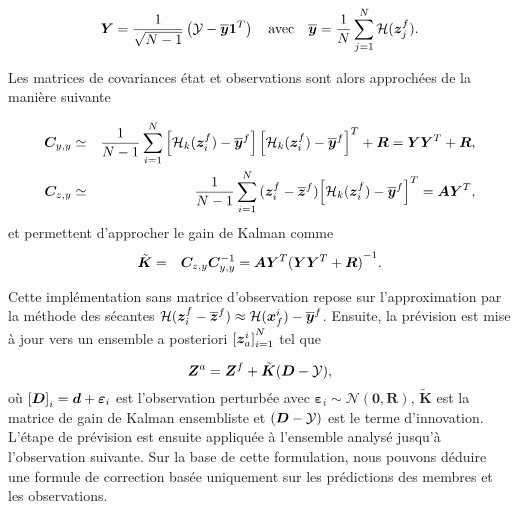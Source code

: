 \begin{equation*}
    \bm Y = \frac{1}{\sqrt{N - 1}} \left(\mathcal Y - \overline{\bm{y}} \bm{1}^T \right) \quad \text{avec} \quad \overline{\bm{y}} = \frac{1}{N} \sum_{j=1}^{N} \mathcal{H}(\bm{z}_j^f).
\end{equation*}

Les matrices de covariances état et observations sont alors approchées de la manière suivante

\begin{eqnarray*}
    \bm C_{y, y} &\simeq& \frac{1}{N -1} \sum_{i = 1}^{N}\left[ \mathcal{H}_k(\bm{z}_i^f) - \overline{\bm{y}}^f\right] {\left[ \mathcal{H}_k(\bm{z}_i^f) - \overline{\bm{y}}^f\right]}^T + \bm R= \bm Y \bm Y^T + \bm R,\\
    \bm C_{z,y} &\simeq& \frac{1}{N - 1} \sum_{i = 1}^{N} {(\bm{z}_i^f - \overline{\bm{z}}^f)} {\left[ \mathcal{H}_k(\bm{z}_i^f) - \overline{\bm{y}}^f\right]}^T  = \bm A \bm Y^T, \\
\end{eqnarray*}
et permettent d'approcher le gain de Kalman comme
\begin{eqnarray*}
    \tilde{\bm{K}} &=& \bm C_{z,y} \bm C_{y,y}^{-1} = \bm A \bm Y^T {(\bm Y \bm Y^T + \bm R)}^{-1}.
\end{eqnarray*}

Cette implémentation sans matrice d'observation repose sur l'approximation par la méthode des sécantes $\mathcal{H}(\bm{z}_i^f - \overline{\bm{z}}^f) \approx \mathcal{H} (\bm{x}^i_f) - \overline{\bm{y}}^f$.
Ensuite, la prévision est mise à jour vers un ensemble a posteriori ${[\bm{z}^i_a]}_{i=1}^{N}$ tel que

\begin{equation} \label{eq:enkf_formula}
    \bm{Z}^a = \bm{Z}^f + \tilde{\bm{K}} ( \bm{D} - \mathcal{Y}),
\end{equation}
où ${[\bm{D}]}_i = \bm{d} + \bm{\varepsilon}_i$ est l'observation perturbée avec $\bm{\varepsilon}_i \sim \mathcal{N}(\bm{0}, \bm R) $, $\tilde{\bm{K}}$ est la matrice de gain de Kalman ensembliste et $( \bm{D} - \mathcal{Y})$ est le terme d'innovation.
L'étape de prévision est ensuite appliquée à l'ensemble analysé jusqu'à l'observation suivante.
Sur la base de cette formulation, nous pouvons déduire une formule de correction basée uniquement sur les prédictions des membres et les observations.


